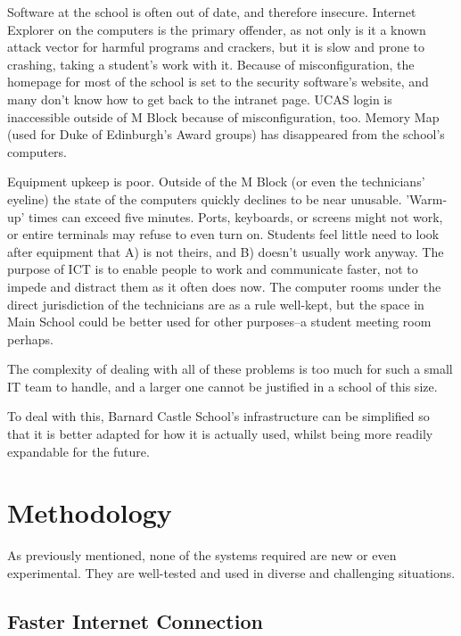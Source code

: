 \documentclass[a4paper,leqno,titlepage]{article}
\begin{document}
Software at the school is often out of date, and therefore insecure.
Internet Explorer on the computers is the primary offender, as not only is it
a known attack vector for harmful programs and crackers, but it is slow and
prone to crashing, taking a student's work with it. Because of misconfiguration,
the homepage for most of the school is set to the security software's website,
and many don't know how to get back to the intranet page. UCAS login is
inaccessible outside of M Block because of misconfiguration, too. Memory Map
(used for Duke of Edinburgh's Award groups) has disappeared from the school's
computers.


Equipment upkeep is poor. Outside of the M Block (or even the
technicians' eyeline) the state of the computers quickly declines to be near
unusable. 'Warm-up' times can exceed five minutes. Ports, keyboards, or screens
might not work, or entire terminals may refuse to even turn on.
Students feel little need to look after equipment that A) is not theirs,
and B) doesn't usually work anyway. The purpose of ICT is to enable
people to work and communicate faster, not to impede and distract them as it
often does now. The computer rooms under the direct jurisdiction of the
technicians are as a rule well-kept, but the space in Main School could be
better used for other purposes--a student meeting room perhaps.


The complexity of dealing with all of these problems is too much for such a
small IT team to handle, and a larger one cannot be justified in a school of
this size.


To deal with this, Barnard Castle School's infrastructure can be simplified
so that it is better adapted for how it is actually used, whilst being more
readily expandable for the future.



\break

\section{Methodology}


As previously mentioned, none of the systems required are new or even
experimental. They are well-tested and used in diverse and challenging
situations.

\subsection{Faster Internet Connection}
\end{document}
